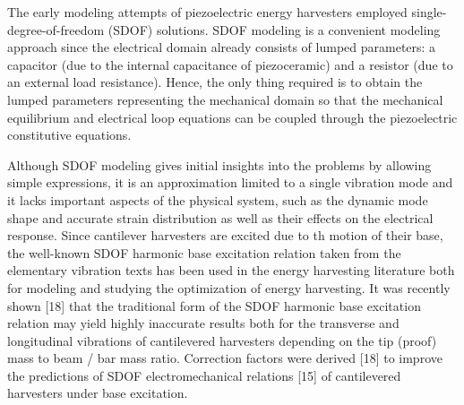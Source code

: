 \documentclass{article}
\begin{document}
The early modeling attempts of piezoelectric energy harvesters employed single-degree-of-freedom (SDOF) solutions. SDOF modeling is a convenient modeling approach since the electrical domain already consists of lumped parameters: a capacitor (due to the internal capacitance of piezoceramic) and a resistor (due to an external load resistance). Hence, the only thing required is to obtain the lumped parameters representing the mechanical domain so that the mechanical equilibrium and electrical loop equations can be coupled through the piezoelectric constitutive equations.

Although SDOF modeling gives initial insights into the problems by allowing simple expressions, it is an approximation limited to a single vibration mode and it lacks important aspects of the physical system, such as the dynamic mode shape and accurate strain distribution as well as their effects on the electrical response. Since cantilever harvesters are excited due to th motion of their base, the well-known SDOF harmonic base excitation relation taken from the elementary vibration texts has been used in the energy harvesting literature both for modeling and studying the optimization of energy harvesting. It was recently shown [18] that the traditional form of the SDOF harmonic base excitation relation may yield highly inaccurate results both for the transverse and longitudinal vibrations of cantilevered harvesters depending on the tip (proof) mass to beam / bar mass ratio. Correction factors were derived [18] to improve the predictions of SDOF electromechanical relations [15] of cantilevered harvesters under base excitation.
\end{document}
